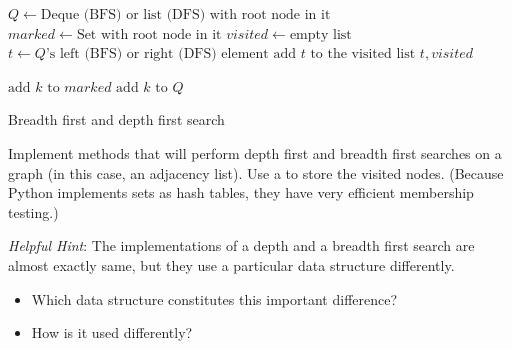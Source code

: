 \begin{algorithm}
\begin{algorithmic}[1]
	\State $Q \gets \text{Deque (BFS) or list (DFS) with root node in it}$	
	\State $marked \gets \text{Set with root node in it}$	
	\State $visited \gets \text{empty list}$	
							
		\State $t \gets Q\text{'s left (BFS) or right (DFS) element}$	
		\State $\text{add }t \text{ to the visited list}$
									
			\State {} $t,visited$
		
		\Else										{}
					\State $\text{add } k \text{ to } marked$
					\State $\text{add } k \text{ to } Q$
				\EndIf
			\EndFor
		\EndIf
	\EndWhile
\EndProcedure
\end{algorithmic}
\caption{Breadth first and depth first search}
\label{alg:BFSDFS}
\end{algorithm}

\begin{problem}
Implement methods that will perform depth first and breadth first searches on a graph (in this case, an adjacency list).
Use a  to store the visited nodes. (Because Python implements sets as hash tables, they have very efficient membership testing.)

\emph{Helpful Hint}: The implementations of a depth and a breadth first search
are almost exactly same, but they use a particular data structure differently.
\begin{itemize}
\item Which data structure constitutes this important difference?
\item How is it used differently?
\end{itemize}
\end{problem}

